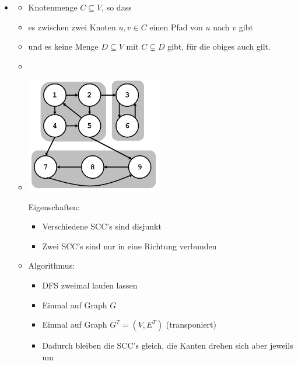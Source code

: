 \documentclass[
    12pt,
    a4paper,
    ngerman,
    color=3b,%
    marginpar=false,
    colorback=false,
    leqno,
]{tudaexercise}
\begin{document}
\begin{itemize}
        \item {}
            \begin{itemize}
                \item Knotenmenge $C \subseteq V$, so dass
                \item[] es zwischen zwei Knoten $u,v \in C$ einen Pfad von $u$ nach $v$ gibt
                \item[] und es keine Menge $D \subseteq V$ mit $C \subsetneq D$ gibt, für die obiges auch gilt.
                \item[] 
                \item[]
                    \begin{minipage}{0.35\textwidth}
                        \includegraphics[width=6cm]{pictures/scc.PNG}
                    \end{minipage} 
                    \begin{minipage}{0.55\textwidth}
                    Eigenschaften:
                        \begin{itemize}
                            \item Verschiedene SCC's sind disjunkt
                            \item Zwei SCC's sind nur in eine Richtung verbunden
                        \end{itemize}
                    \end{minipage}
                \item Algorithmus:
                    \begin{itemize}
                        \item DFS zweimal laufen lassen
                        \item[] Einmal auf Graph $G$
                        \item[] Einmal auf Graph $G^T = (V,E^T)$ (transponiert)
                        \item Dadurch bleiben die SCC's gleich, die Kanten drehen sich aber jeweils um

\end{itemize}
\end{itemize}
\end{itemize}
\end{document}
